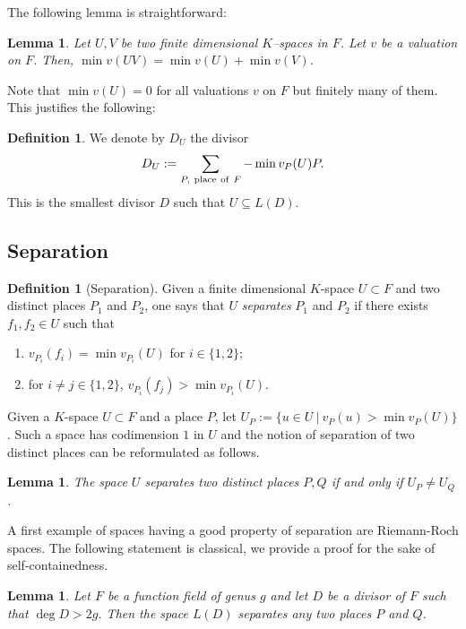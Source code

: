 \documentclass{article}
\theoremstyle{plain}
\newtheorem{lemma}[thm]{Lemma}
\theoremstyle{definition}
\newtheorem{defn}[thm]{Definition}
\theoremstyle{remark}
\begin{document}
The following lemma is straightforward:

\begin{lemma}\label{lem:sum_min_val}
  Let $U,V$
  be two finite dimensional $K$--spaces in $F$. Let $v$ be a valuation on $F$.
  Then,
  $\min v(UV) = \min v(U)+ \min v(V)$.
\end{lemma}

Note that $\min v(U) = 0$ for all valuations $v$ on $F$ but finitely many
of them. This justifies the following:

\begin{defn}\label{def:DU}
We denote by $D_U$ the divisor
$$
D_U := \sum_{P,\ {\rm place \ of\  }F} -\min v_P(U)P.
$$
This is the smallest divisor $D$ such that $U \subseteq L(D)$.  
\end{defn}


\subsection{Separation}
\label{sec:separation}

\begin{defn}[Separation]
  Given a finite dimensional $K$-space
  $U \subset F$ and two distinct places $P_1$ and $P_2$, one says that
  $U$ {\em separates} $P_1$ and $P_2$ if
  there exists $f_1, f_2 \in U$ such that
  \begin{enumerate}
    \item $v_{P_i} (f_i) = \min v_{P_i}(U)$ for $i \in \{1,2\}$;
    \item for $i \neq j \in \{1,2\}$, $v_{P_i}(f_j) > \min v_{P_i}(U)$.
  \end{enumerate}
\end{defn}

Given a $K$-space $U \subset F$ and a place $P$, let $U_P := \{
u \in U ~|~ v_P(u) > \min v_P(U)\}$. Such a space has codimension $1$
in $U$ and the notion of separation of two distinct places can be reformulated
as follows.

\begin{lemma}\label{lem:U_pU_Q}
  The space $U$ separates two distinct places $P, Q$ if and only if
  $U_P \neq U_Q$.
\end{lemma}

A first example of spaces having a good property of separation are
Riemann-Roch spaces. The following statement is classical, we provide
a proof for the sake of self-containedness.

\begin{lemma}\label{lem:L(D)sep}
  Let $F$ be a function field of genus $g$ and let $D$ be a divisor of $F$
  such that $\deg D > 2g$. Then the space $L(D)$
  separates any two places $P$ and $Q$. 
\end{lemma}
\end{document}
